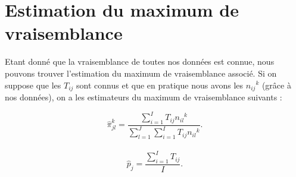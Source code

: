 \documentclass[a4paper,french,10pt]{article}
\begin{document}
	\section{Estimation du maximum de vraisemblance}
	Etant donné que la vraisemblance de toutes nos données est connue, nous pouvons trouver l'estimation du maximum de vraisemblance associé. Si on suppose que les $T_{ij}$ sont connus et que en pratique nous avons les ${{n_{ij}}^{k}}$ (grâce à nos données), on a les estimateurs du maximum de vraisemblance suivants :
	
	\[\hat{\pi}_{jl}^k = \frac{\sum_{i=1}^{I} T_{ij} {n_{il}}^{k}}{\sum_{l=1}^{J} \sum_{i=1}^{I}  T_{ij} {n_{il}}^{k}}.\]\\
	\[\hat{p}_j = \frac{\sum_{i=1}^{I} T_{ij}}{I}.\]
	
	
	
	
	
	
	
\end{document}
